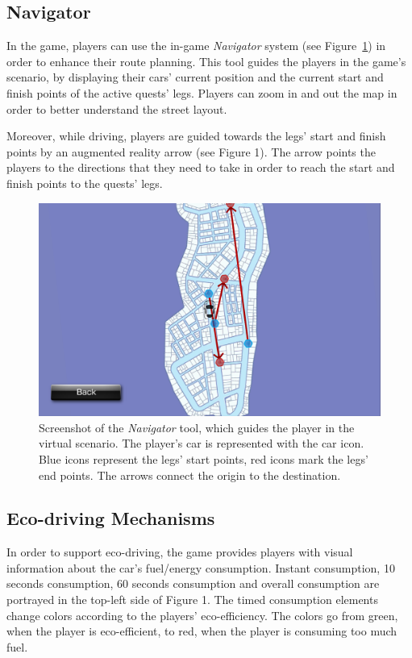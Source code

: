 \documentclass[preprint,authoryear,12pt]{elsarticle}
\begin{document}
\subsection{Navigator}

In the game, players can use the in-game \textit{Navigator} system (see Figure~\ref{fig:iCO2_navigator}) in order to enhance their route planning. This tool guides the players in the game's scenario, by displaying their cars' current position and the current start and finish points of the active quests' legs. Players can zoom in and out the map in order to better understand the street layout.

Moreover, while driving, players are guided towards the legs' start and finish points by an augmented reality arrow (see Figure 1). The arrow points the players to the directions that they need to take in order to reach the start and finish points to the quests' legs.

\begin{figure}[htb]
\begin{center}
\includegraphics[width=.95\linewidth]{ijhcs14-img/iCO2_navigator}
\caption{Screenshot of the \textit{Navigator} tool, which guides the player in the virtual scenario. The player's car is represented with the car icon. Blue icons represent the legs' start points, red icons mark the legs' end points. The arrows connect the origin to the destination.\label{fig:iCO2_navigator}}
\end{center}
\end{figure}

\subsection{Eco-driving Mechanisms}

In order to support eco-driving, the game provides players with visual information about the car's fuel/energy consumption. Instant consumption, 10 seconds consumption, 60 seconds consumption and overall consumption are portrayed in the top-left side of Figure 1. The timed consumption elements change colors according to the players' eco-efficiency. The colors go from green, when the player is eco-efficient, to red, when the player is consuming too much fuel.
\end{document}
